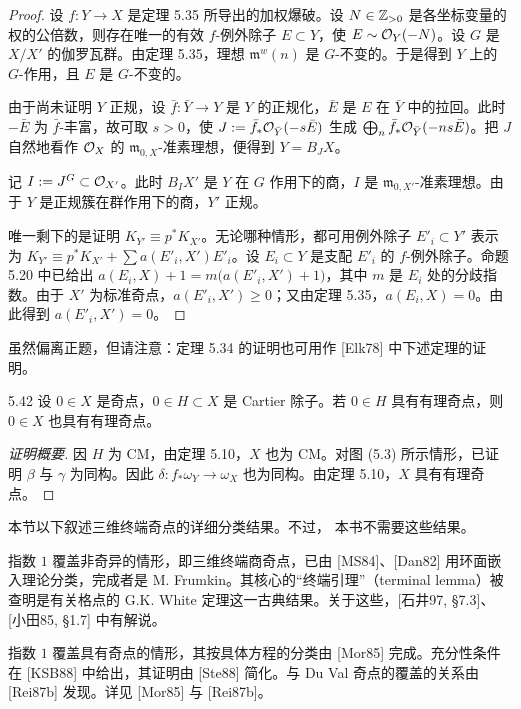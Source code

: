 \begin{proof}
设 $f\colon Y\to X$ 是定理 5.35 所导出的加权爆破。设 $N\in\mathbb{Z}_{>0}$ 是各坐标变量的权的公倍数，则存在唯一的有效 $f$-例外除子 $E\subset Y$，使 $E\sim\mathcal{O}_Y(-N)$。设 $G$ 是 $X/X'$ 的伽罗瓦群。由定理 5.35，理想 $\mathfrak{m}^w(n)$ 是 $G$-不变的。于是得到 $Y$ 上的 $G$-作用，且 $E$ 是 $G$-不变的。

由于尚未证明 $Y$ 正规，设 $\bar f\colon\bar Y\to Y$ 是 $Y$ 的正规化，$\bar E$ 是 $E$ 在 $\bar Y$ 中的拉回。此时 $-\bar E$ 为 $\bar f$-丰富，故可取 $s>0$，使 $J:=\bar f_*\mathcal{O}_{\bar Y}(-s\bar E)$ 生成 $\bigoplus_n\bar f_*\mathcal{O}_{\bar Y}(-ns\bar E)$。把 $J$ 自然地看作 $\mathcal{O}_X$ 的 $\mathfrak{m}_{0,X}$-准素理想，便得到 $Y=B_JX$。

记 $I:=J^G\subset\mathcal{O}_{X'}$。此时 $B_IX'$ 是 $Y$ 在 $G$ 作用下的商，$I$ 是 $\mathfrak{m}_{0,X'}$-准素理想。由于 $Y$ 是正规簇在群作用下的商，$Y'$ 正规。

唯一剩下的是证明 $K_{Y'}\equiv p^*K_{X'}$。无论哪种情形，都可用例外除子 $E'_i\subset Y'$ 表示为 $K_{Y'}\equiv p^*K_{X'}+\sum a(E'_i,X')E'_i$。设 $E_i\subset Y$ 是支配 $E'_i$ 的 $f$-例外除子。命题 5.20 中已给出 $a(E_i,X)+1=m\bigl(a(E'_i,X')+1\bigr)$，其中 $m$ 是 $E_i$ 处的分歧指数。由于 $X'$ 为标准奇点，$a(E'_i,X')\ge0$；又由定理 5.35，$a(E_i,X)=0$。由此得到 $a(E'_i,X')=0$。
\end{proof}

虽然偏离正题，但请注意：定理 5.34 的证明也可用作 [Elk78] 中下述定理的证明。

\begin{theoremp}{5.42}
设 $0\in X$ 是奇点，$0\in H\subset X$ 是 Cartier 除子。若 $0\in H$ 具有有理奇点，则 $0\in X$ 也具有有理奇点。
\end{theoremp}

\begin{proof}[证明概要]
因 $H$ 为 CM，由定理 5.10，$X$ 也为 CM。对图 (5.3) 所示情形，已证明 $\beta$ 与 $\gamma$ 为同构。因此 $\delta\colon f_*\omega_Y\to\omega_X$ 也为同构。由定理 5.10，$X$ 具有有理奇点。
\end{proof}

本节以下叙述三维终端奇点的详细分类结果。不过，
本书不需要这些结果。

指数 $1$ 覆盖非奇异的情形，即三维终端商奇点，已由 [MS84]、[Dan82] 用环面嵌入理论分类，完成者是 M. Frumkin。其核心的“终端引理”（terminal lemma）被查明是有关格点的 G.K. White 定理这一古典结果。关于这些，[石井97, §7.3]、[小田85, §1.7] 中有解说。

指数 $1$ 覆盖具有奇点的情形，其按具体方程的分类由 [Mor85] 完成。充分性条件在 [KSB88] 中给出，其证明由 [Ste88] 简化。与 Du Val 奇点的覆盖的关系由 [Rei87b] 发现。详见 [Mor85] 与 [Rei87b]。

